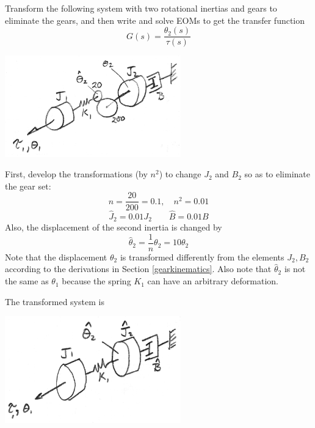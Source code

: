\begin{Example}
Transform the following system with two rotational inertias and gears to eliminate the gears, and then write and solve EOMs to get the transfer function
\[
G(s) = \frac {\theta_2(s)} {\tau(s)}
\]

\includegraphics[width=3.0in]{figs03/00751a.png}

First, develop the transformations (by $n^2$) to change $J_2$ and $B_2$ so as to eliminate the gear set:
\[
n = \frac{20}{200} = 0.1, \quad n^2 = 0.01
\]
\[
\hat{J}_2 = 0.01 J_2 \qquad  \hat{B} = 0.01B
\]
Also, the displacement of the second inertia is changed by
\[
\hat{\theta}_2 = \frac{1}{n}\theta_2 = 10 \theta_2
\]
Note that the displacement $\theta_2$ is transformed differently from the elements $J_2,B_2$ according to the derivations in Section \ref{gearkinematics}.
Also note that $\hat{\theta}_2$ is not the same as $\theta_1$ because the spring $K_1$ can have an arbitrary deformation.

The transformed system is

\includegraphics[width=3.0in]{figs03/00752a.png}


\end{Example}

